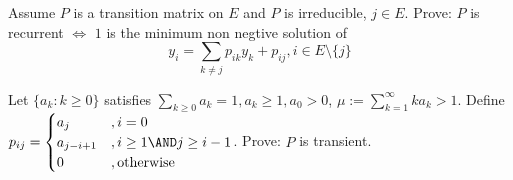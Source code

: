 \documentclass{ctexart}
\begin{document}
%
%
\begin{problem}\label{pro:7}
  Assume \(P\) is a transition matrix on \(E\) and \(P\) is irreducible, \(j \in E\).
  Prove: \(P\) is recurrent \(\iff\) \(1\) is the minimum non negtive solution of
  \[
    y_i = \sum_{k \neq j} p_{ik}y_k + p_{ij}, i \in E\setminus\{j\}
  \]
\end{problem}
\begin{solution}

\end{solution}

\begin{problem}\label{pro:8}
  Let \(\{a_k:k \geq 0\}\) satisfies \(\sum_{k \geq 0}a_k =1, a_k \geq 1, a_0 >0\), \(\mu :=\sum_{k=1}^{\infty} ka_k >1\).
  Define \(p_{ij}=
  \begin{cases}
    a_j         & , i =0                    \\
    a_{j-i + 1} & ,i \geq 1 \AND j \geq i-1 \\
    0           & ,\text{otherwise}
  \end{cases}
  \).
  Prove: \(P\) is transient.
\end{problem}
\end{document}
